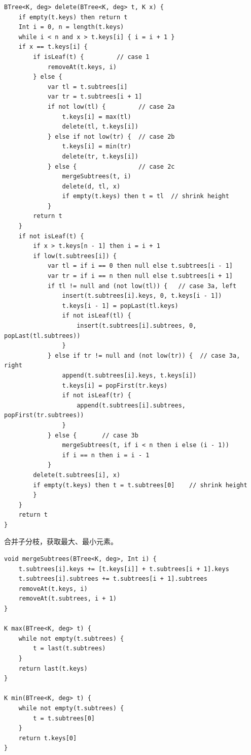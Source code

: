 \documentclass[b5paper]{ctexart}
\begin{document}
\begin{lstlisting}[language = Bourbaki]
BTree<K, deg> delete(BTree<K, deg> t, K x) {
    if empty(t.keys) then return t
    Int i = 0, n = length(t.keys)
    while i < n and x > t.keys[i] { i = i + 1 }
    if x == t.keys[i] {
        if isLeaf(t) {         // case 1
            removeAt(t.keys, i)
        } else {
            var tl = t.subtrees[i]
            var tr = t.subtrees[i + 1]
            if not low(tl) {         // case 2a
                t.keys[i] = max(tl)
                delete(tl, t.keys[i])
            } else if not low(tr) {  // case 2b
                t.keys[i] = min(tr)
                delete(tr, t.keys[i])
            } else {                 // case 2c
                mergeSubtrees(t, i)
                delete(d, tl, x)
                if empty(t.keys) then t = tl  // shrink height
            }
        return t
    }
    if not isLeaf(t) {
        if x > t.keys[n - 1] then i = i + 1
        if low(t.subtrees[i]) {
            var tl = if i == 0 then null else t.subtrees[i - 1]
            var tr = if i == n then null else t.subtrees[i + 1]
            if tl != null and (not low(tl)) {   // case 3a, left
                insert(t.subtrees[i].keys, 0, t.keys[i - 1])
                t.keys[i - 1] = popLast(tl.keys)
                if not isLeaf(tl) {
                    insert(t.subtrees[i].subtrees, 0, popLast(tl.subtrees))
                }
            } else if tr != null and (not low(tr)) {  // case 3a, right
                append(t.subtrees[i].keys, t.keys[i])
                t.keys[i] = popFirst(tr.keys)
                if not isLeaf(tr) {
                    append(t.subtrees[i].subtrees, popFirst(tr.subtrees))
                }
            } else {       // case 3b
                mergeSubtrees(t, if i < n then i else (i - 1))
                if i == n then i = i - 1
            }
        delete(t.subtrees[i], x)
        if empty(t.keys) then t = t.subtrees[0]    // shrink height
        }
    }
    return t
}
\end{lstlisting}

合并子分枝，获取最大、最小元素。

\begin{lstlisting}[language = Bourbaki]
void mergeSubtrees(BTree<K, deg>, Int i) {
    t.subtrees[i].keys += [t.keys[i]] + t.subtrees[i + 1].keys
    t.subtrees[i].subtrees += t.subtrees[i + 1].subtrees
    removeAt(t.keys, i)
    removeAt(t.subtrees, i + 1)
}

K max(BTree<K, deg> t) {
    while not empty(t.subtrees) {
        t = last(t.subtrees)
    }
    return last(t.keys)
}

K min(BTree<K, deg> t) {
    while not empty(t.subtrees) {
        t = t.subtrees[0]
    }
    return t.keys[0]
}
\end{lstlisting}
\end{document}
